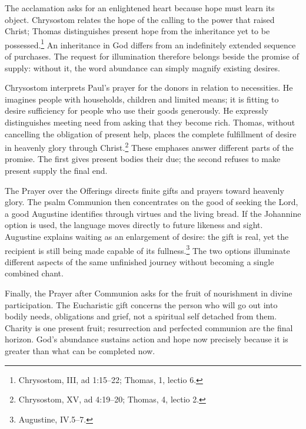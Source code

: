 The acclamation asks for an enlightened heart because hope must learn its object. Chrysostom relates the hope of the calling to the power that raised Christ; Thomas distinguishes present hope from the inheritance yet to be possessed.\footnote{Chrysostom,  III, ad 1:15--22; Thomas,  1, lectio 6.} An inheritance in God differs from an indefinitely extended sequence of purchases. The request for illumination therefore belongs beside the promise of supply: without it, the word abundance can simply magnify existing desires.

Chrysostom interprets Paul's prayer for the donors in relation to necessities. He imagines people with households, children and limited means; it is fitting to desire sufficiency for people who use their goods generously. He expressly distinguishes meeting need from asking that they become rich. Thomas, without cancelling the obligation of present help, places the complete fulfillment of desire in heavenly glory through Christ.\footnote{Chrysostom,  XV, ad 4:19--20; Thomas,  4, lectio 2.} These emphases answer different parts of the promise. The first gives present bodies their due; the second refuses to make present supply the final end.

The Prayer over the Offerings directs finite gifts and prayers toward heavenly glory. The psalm Communion then concentrates on the good of seeking the Lord, a good Augustine identifies through virtues and the living bread. If the Johannine option is used, the language moves directly to future likeness and sight. Augustine explains waiting as an enlargement of desire: the gift is real, yet the recipient is still being made capable of its fullness.\footnote{Augustine,  IV.5--7.} The two options illuminate different aspects of the same unfinished journey without becoming a single combined chant.

Finally, the Prayer after Communion asks for the fruit of nourishment in divine participation. The Eucharistic gift concerns the person who will go out into bodily needs, obligations and grief, not a spiritual self detached from them. Charity is one present fruit; resurrection and perfected communion are the final horizon. God's abundance sustains action and hope now precisely because it is greater than what can be completed now.

